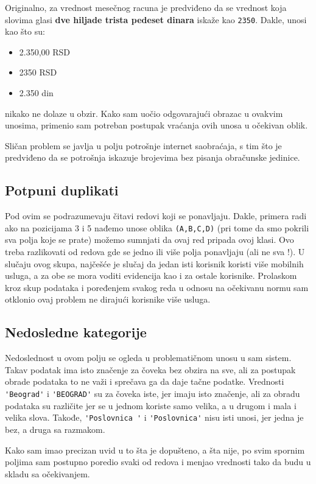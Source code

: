 \documentclass[a4paper,12pt]{article}
\begin{document}
    Originalno, za vrednost mesečnog racuna je predviđeno da se vrednost koja slovima glasi \textbf{dve hiljade trista pedeset dinara} iskaže kao \verb|2350|. Dakle, unosi kao što su:
    \begin{itemize}
        \item {2.350,00 RSD}
        \item {2350 RSD }
        \item {2.350 din}
        \end{itemize}
    nikako ne dolaze u obzir. Kako sam uočio odgovarajući obrazac u ovakvim unosima, primenio sam potreban postupak vraćanja
    ovih unosa u očekivan oblik.

    Sličan problem se javlja u polju potrošnje internet saobraćaja, s tim što je predviđeno da se potrošnja iskazuje brojevima bez pisanja obračunske jedinice.
    \subsection*{Potpuni duplikati}
    Pod ovim se podrazumevaju čitavi redovi koji se ponavljaju. Dakle, primera radi ako na pozicijama 3 i 5 nađemo unose oblika \verb|(A,B,C,D)| (pri tome da smo pokrili sva polja koje se prate)
    možemo sumnjati da ovaj red pripada ovoj klasi. Ovo treba razlikovati od redova gde se jedno ili više polja ponavljaju (ali ne sva !). U slučaju
    ovog skupa, najčešće je slučaj da jedan isti korisnik koristi više mobilnih usluga, a za obe se mora voditi evidencija kao i za ostale korisnike.
    Prolaskom kroz skup podataka i poređenjem svakog reda u odnosu na očekivanu normu sam otklonio ovaj problem ne dirajući korisnike više usluga.

    \subsection*{Nedosledne kategorije}

    Nedoslednost u ovom polju se ogleda u problematičnom unosu u sam sistem. Takav podatak ima isto značenje za čoveka bez obzira na sve, ali
    za postupak obrade podataka to ne važi i sprečava ga da daje tačne podatke. Vrednosti \verb|'Beograd'| i \verb|'BEOGRAD'| su za čoveka iste, jer imaju isto značenje,
    ali za obradu podataka su različite jer se u jednom koriste samo velika, a u drugom i mala i velika slova. Takođe, \verb|'Poslovnica '| i \verb|'Poslovnica'| nisu isti unosi,
    jer jedna je bez, a druga sa razmakom.

    Kako sam imao precizan uvid u to šta je dopušteno, a šta nije, po svim spornim poljima sam postupno poredio svaki od redova  i menjao vrednosti tako da budu u skladu sa očekivanjem.
\end{document}
